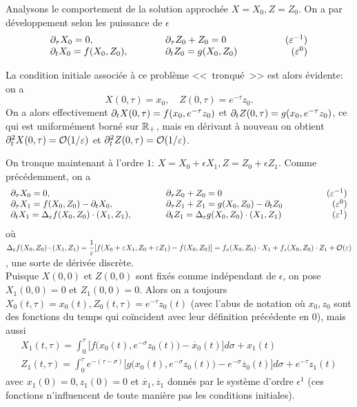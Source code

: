 Analysons le comportement de la solution approchée $X = X_0, Z = Z_0$. On a par développement selon les puissance de $\epsilon$
\begin{equation*}
\begin{array}{lclr}
\partial_{\tau} X_0 = 0, &\qquad& \partial_{\tau} Z_0 + Z_0 = 0 &\qquad \qquad (\varepsilon^{-1}) \\
\partial_t X_0 = f(X_0,Z_0), &\qquad& \partial_t Z_0 = g(X_0,Z_0) &\qquad \qquad (\varepsilon^0)
\end{array}
\end{equation*}

La condition initiale associée à ce problème <<~tronqué~>> est alors évidente: on a 
\begin{equation}
X(0,\tau) = x_0, \quad Z(0,\tau) = e^{-\tau}z_0.
\end{equation}
On a alors effectivement $\partial_t X(0,\tau) = f(x_0,e^{-\tau}z_0)$ et $\partial_t Z(0,\tau) = g(x_0,e^{-\tau}z_0)$, ce qui est uniformément borné sur $\mathbb{R}_+$, mais en dérivant à nouveau on obtient $\partial_t^2 X(0,\tau) = \mathcal{O}(1/\varepsilon)$ et $\partial_t^2 Z(0,\tau) = \mathcal{O}(1/\varepsilon)$. 

On tronque maintenant à l'ordre $1$: $X = X_0 + \epsilon X_1, Z = Z_0 + \epsilon Z_1$. Comme précédemment, on a 
\begin{equation*}
\begin{array}{lclr}
\partial_{\tau} X_0 = 0, &\qquad& \partial_{\tau} Z_0 + Z_0 = 0 &\qquad \qquad (\varepsilon^{-1}) \\
\partial_{\tau} X_1 = f(X_0,Z_0) - \partial_t X_0, &\qquad& \partial_{\tau} Z_1 + Z_1 = g(X_0,Z_0) - \partial_t Z_0 &\qquad \qquad (\varepsilon^0) \\
\partial_t X_1 = \Delta_{\varepsilon}f(X_0,Z_0)\cdot (X_1,Z_1), &\qquad& \partial_t Z_1 = \Delta_{\varepsilon}g(X_0,Z_0)\cdot(X_1,Z_1) &\qquad \qquad (\varepsilon^1)
\end{array}
\end{equation*}
où $\Delta_{\varepsilon} f(X_0,Z_0)\cdot(X_1,Z_1) = \dfrac{1}{\varepsilon}[f(X_0 + \varepsilon X_1, Z_0 + \varepsilon Z_1) - f(X_0, Z_0)] = f_x(X_0,Z_0)\cdot X_1 + f_z(X_0,Z_0)\cdot Z_1 + \mathcal{O}(\varepsilon)$, une sorte de dérivée discrète. \\

Puisque $X(0,0)$ et $Z(0,0)$ sont fixés comme indépendant de $\epsilon$, on pose $X_1(0,0) = 0$ et $Z_1(0,0) = 0$. 
Alors on a toujours $X_0(t,\tau) = x_0(t), Z_0(t,\tau) = e^{-\tau}z_0(t)$ (avec l'abus de notation où $x_0,z_0$ sont des fonctions du temps qui coïncident avec leur définition précédente en 0), mais aussi 
\begin{equation*}
\begin{array}{l}
\displaystyle
X_1(t,\tau) = \int_0^{\tau} \Big[f\big(x_0(t),e^{-\sigma}z_0(t)\big) - \dot{x_0}(t)\Big] d\sigma + x_1(t) \\
\displaystyle
Z_1(t,\tau) = \int_0^{\tau} e^{-(\tau-\sigma)}\Big[g\big(x_0(t),e^{-\sigma}z_0(t)\big) - e^{-\sigma}\dot{z_0}(t)\Big]d\sigma + e^{-\tau}z_1(t)
\end{array}
\end{equation*}
avec $x_1(0) = 0, z_1(0) = 0$ et $\dot{x_1},\dot{z_1}$ donnés par le système d'ordre $\epsilon^1$ (ces fonctions n'influencent de toute manière pas les conditions initiales). 

